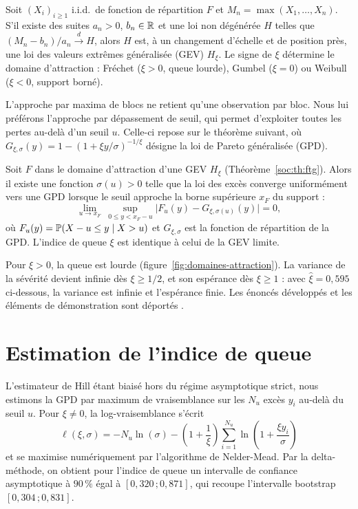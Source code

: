 \begin{theorem}\label{soc:th:ftg}
Soit $(X_i)_{i\ge1}$ i.i.d.\ de fonction de répartition $F$ et $M_n=\max(X_1,\dots,X_n)$. S'il existe des suites $a_n>0$, $b_n\in\mathbb{R}$ et une loi non dégénérée $H$ telles que $(M_n-b_n)/a_n \xrightarrow{d} H$, alors $H$ est, à un changement d'échelle et de position près, une loi des valeurs extrêmes généralisée (GEV) $H_\xi$. Le signe de $\xi$ détermine le domaine d'attraction : Fréchet ($\xi>0$, queue lourde), Gumbel ($\xi=0$) ou Weibull ($\xi<0$, support borné).
\end{theorem}

\noindent L'approche par maxima de blocs ne retient qu'une observation par bloc. Nous lui
préférons l'approche par dépassement de seuil, qui permet d'exploiter toutes les pertes au-delà d'un
seuil $u$. Celle-ci repose sur le théorème suivant, où
$G_{\xi,\sigma}(y)=1-\left(1+\xi y/\sigma\right)^{-1/\xi}$ désigne la loi de Pareto
généralisée (GPD).

\begin{theorem}\label{soc:th:balkema}
Soit $F$ dans le domaine d'attraction d'une GEV $H_\xi$ (Théorème~\ref{soc:th:ftg}). Alors il existe une fonction $\sigma(u)>0$ telle que la loi des excès converge uniformément vers une GPD lorsque le seuil approche la borne supérieure $x_F$ du support :
\begin{equation}
\lim_{u\to x_F}\ \sup_{0\le y< x_F-u}\bigl|F_u(y)-G_{\xi,\sigma(u)}(y)\bigr|=0,
\end{equation}
où $F_u(y)=\mathbb{P}(X-u\le y\mid X>u)$ et $G_{\xi,\sigma}$ est la fonction de répartition de la GPD. L'indice de queue $\xi$ est identique à celui de la GEV limite.
\end{theorem}

\noindent Pour $\xi>0$, la queue est lourde (figure~\ref{fig:domaines-attraction}). La variance de la
sévérité devient infinie dès $\xi\ge 1/2$, et son espérance dès $\xi\ge 1$ \citep{mcneil2015} :
avec $\hat\xi=0{,}595$ ci-dessous, la variance est infinie et l'espérance finie. Les énoncés développés
et les éléments de démonstration sont déportés \matcomp.

\section{Estimation de l'indice de queue}


L'estimateur de Hill étant biaisé hors du régime asymptotique strict, nous estimons la GPD par
maximum de vraisemblance sur les $N_u$ excès $y_i$ au-delà du seuil $u$. Pour $\xi \neq 0$, la
log-vraisemblance s'écrit
\begin{equation}
\ell(\xi, \sigma) = -N_u \ln(\sigma) - \left(1 + \frac{1}{\xi}\right) \sum_{i=1}^{N_u} \ln\left(1 + \frac{\xi y_i}{\sigma}\right)
\label{soc:eq:loglik-gpd}
\end{equation}
et se maximise numériquement par l'algorithme de Nelder-Mead. Par la delta-méthode, on obtient pour
l'indice de queue un intervalle de confiance asymptotique à $90\,\%$ égal à $[0{,}320\,;0{,}871]$,
qui recoupe l'intervalle bootstrap $[0{,}304\,;0{,}831]$.

